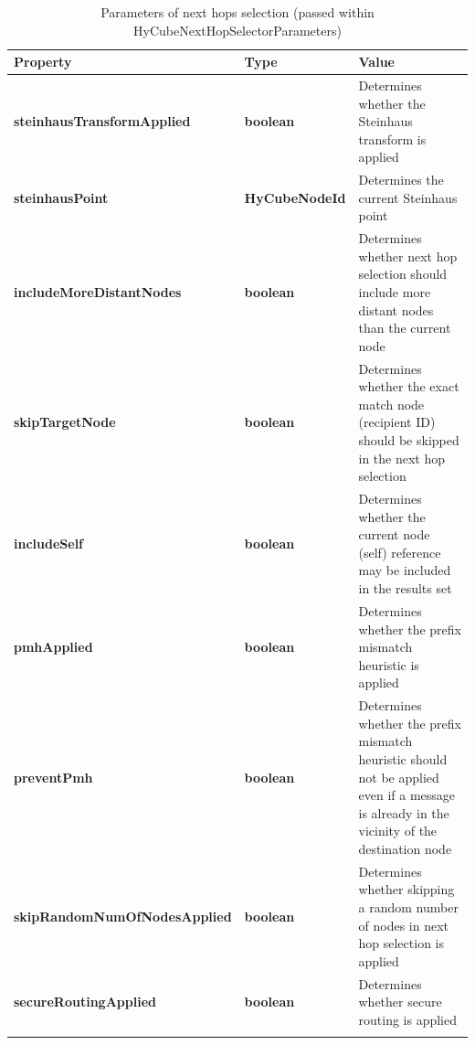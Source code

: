 \begin{center}
\scriptsize
\begin{longtable}{p{4.5cm} p{2.0cm} p{8.0cm}}
	\hline
	\textbf{Property}										& \textbf{Type}			& \textbf{Value}					\\[1mm]
    \hline
	\textbf{steinhausTransformApplied}			& \textbf{boolean}			& Determines whether the Steinhaus transform is applied						\\[1.5mm]
	\textbf{steinhausPoint}						& \textbf{HyCubeNodeId}		& Determines the current Steinhaus point									\\[1.5mm]
	\textbf{includeMoreDistantNodes}			& \textbf{boolean}			& Determines whether next hop selection should include more distant nodes than the current node				\\[1.5mm]
	\textbf{skipTargetNode}						& \textbf{boolean}			& Determines whether the exact match node (recipient ID) should be skipped in the next hop selection		\\[1.5mm]
	\textbf{includeSelf}						& \textbf{boolean}			& Determines whether the current node (self) reference may be included in the results set					\\[1.5mm]
	\textbf{pmhApplied}							& \textbf{boolean}			& Determines whether the prefix mismatch heuristic is applied						\\[1.5mm]
	\textbf{preventPmh}							& \textbf{boolean}			& Determines whether the prefix mismatch heuristic should not be applied even if a message is already in the vicinity of the destination node	\\[1.5mm]
	\textbf{skipRandomNumOfNodesApplied}		& \textbf{boolean}			& Determines whether skipping a random number of nodes in next hop selection is applied						\\[1.5mm]
	\textbf{secureRoutingApplied}				& \textbf{boolean}			& Determines whether secure routing is applied																\\[1.5mm]
    \hline
\caption{Parameters of next hops selection (passed within HyCubeNextHopSelectorParameters)}
\label{tab:libPropHyCubeNextHopSelectorParameters}
\end{longtable}
\end{center}


